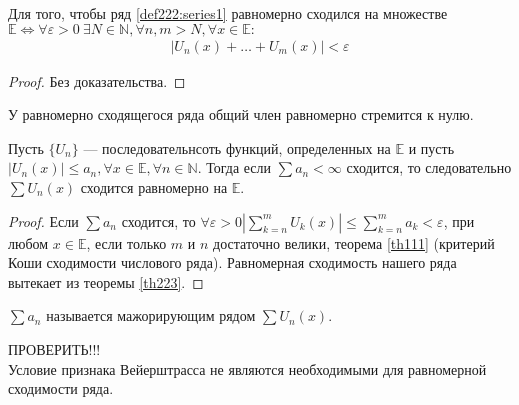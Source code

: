 \begin{theorem}
  \label{th223}
  Для того, чтобы ряд \eqref{def222:series1} равномерно сходился на множестве
  $\mathbb{E} \Longleftrightarrow \forall \varepsilon > 0 \ \exists N \in \mathbb{N},
  \forall n,m > N,
  \forall x \in \mathbb{E}: $
  \begin{gather}
    |U_n(x) + \dots + U_m(x)| < \varepsilon \label{th223:uneq1}
  \end{gather}
\end{theorem}

\begin{proof}
  Без доказательства.
\end{proof}

\begin{consequence}
  У равномерно сходящегося ряда общий член равномерно стремится к нулю.
\end{consequence}

\begin{theorem}
  Пусть $\{U_n\}$ --- последовательнсоть функций, определенных на $\mathbb{E}$
  и пусть $|U_n(x)| \leq a_n, \forall x \in \mathbb{E}, \forall n \in \mathbb{N}.$
  Тогда если $\sum a_n < \infty$ сходится, то следовательно $\sum U_n(x)$ сходится
  равномерно на $\mathbb{E}$.
\end{theorem}
\begin{proof}
  Если $\sum a_n$ сходится, то $\forall \varepsilon > 0 |
  \sum\limits_{k = n}^{m} U_k(x)| \leq
  \sum\limits_{k = n}^{m} a_k < \varepsilon$, при любом $x \in \mathbb{E}$,
  если только $m$ и $n$ достаточно велики, теорема \eqref{th111} (критерий Коши
  сходимости числового ряда). Равномерная сходимость нашего ряда вытекает из
  теоремы \eqref{th223}.
\end{proof}
\begin{remark}
  $\sum a_n$ называется мажорирующим рядом $\sum U_n(x)$.
\end{remark}

\begin{remark}
  ПРОВЕРИТЬ!!! \\
  Условие признака Вейерштрасса не являются необходимыми для равномерной
  сходимости ряда.
\end{remark}

